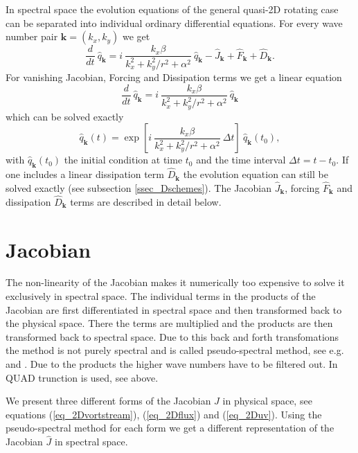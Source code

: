 In spectral space the evolution equations of the general quasi-2D 
rotating case can be separated into individual ordinary differential 
equations. For every wave number pair $\mathbf{k} = (k_{x},k_{y})$ we get
\begin{equation}  \label{eq_evolqhat}
  \frac{d}{dt} \ \hat{q}_{\mathbf{k}}
   =
   i \ \frac{k_{x} \beta}{k_{x}^{2} + k_{y}^{2}/r^{2} + \alpha^{2}} 
     \ \hat{q}_{\mathbf{k}}
   -   \hat{J}_{\mathbf{k}}
   +   \hat{F}_{\mathbf{k}}
   +   \hat{D}_{\mathbf{k}}.
\end{equation}
For vanishing Jacobian, Forcing and Dissipation terms we get a linear 
equation
\begin{equation}  \label{eq_evolqhat_lin}
  \frac{d}{dt} \ \hat{q}_{\mathbf{k}}
   =
   i \ \frac{k_{x} \beta}{k_{x}^{2} + k_{y}^{2}/r^{2} + \alpha^{2}} 
     \ \hat{q}_{\mathbf{k}}
\end{equation}
which can be solved exactly 
\begin{equation} \label{eq_qhatbetasol}
 \hat{q}_{\mathbf{k}}(t)
  = 
 \exp
  \left[
   i \ \frac{k_{x} \beta}{k_{x}^{2} + k_{y}^{2}/r^{2} + \alpha^{2}} \
   \Delta t 
  \right] 
 \ \hat{q}_{\mathbf{k}}(t_{0}),
\end{equation}
with $\hat{q}_{\mathbf{k}}(t_{0})$ the initial condition at time $t_{0}$
and the time interval $\Delta t = t - t_{0}$. If one includes a linear
dissipation term $\hat{D}_{\mathbf{k}}$ the evolution equation can still 
be solved exactly (see subsection \ref{ssec_Dschemes}). The Jacobian 
$\hat{J}_{\mathbf{k}}$, forcing $\hat{F}_{\mathbf{k}}$ and dissipation 
$\hat{D}_{\mathbf{k}}$ terms are described in detail below.
%
\section{Jacobian} \label{sec_jacobian} 
%
The non-linearity of the Jacobian makes it numerically too expensive 
to solve it exclusively in spectral space. The individual terms in 
the products of the Jacobian are first differentiated in spectral
space and then transformed back to the physical space. There the terms 
are multiplied and the products are then transformed back to spectral 
space. Due to this back and forth transfomations the method is not  
purely spectral and is called pseudo-spectral method, see e.g.\ 
\cite{kreissandoliger1972} and \cite{orszag1972}. Due to the products 
the higher wave numbers have to be filtered out. In QUAD trunction is 
used, see above. 

We present three different forms of the Jacobian $J$ in physical space, 
see equations (\ref{eq_2Dvortstream}), (\ref{eq_2Dflux}) 
and (\ref{eq_2Duv}). Using the pseudo-spectral method for each
form we get a different representation of the Jacobian $\hat{J}$ 
in spectral space.   

